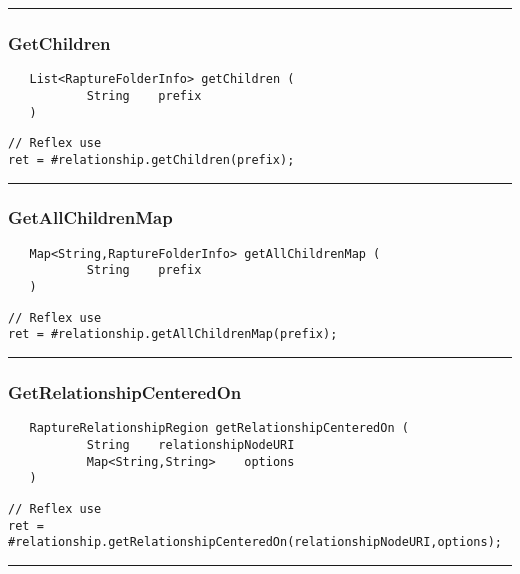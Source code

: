 \rule{15cm}{2pt}
\subsubsection{GetChildren}
\label{Api:GetChildren}
\begin{verbatim}
   List<RaptureFolderInfo> getChildren (
           String    prefix
   )
\end{verbatim}
\begin{lstlisting}[language=reflex]
// Reflex use
ret = #relationship.getChildren(prefix);
\end{lstlisting}



\rule{15cm}{2pt}
\subsubsection{GetAllChildrenMap}
\label{Api:GetAllChildrenMap}
\begin{verbatim}
   Map<String,RaptureFolderInfo> getAllChildrenMap (
           String    prefix
   )
\end{verbatim}
\begin{lstlisting}[language=reflex]
// Reflex use
ret = #relationship.getAllChildrenMap(prefix);
\end{lstlisting}



\rule{15cm}{2pt}
\subsubsection{GetRelationshipCenteredOn}
\label{Api:GetRelationshipCenteredOn}
\begin{verbatim}
   RaptureRelationshipRegion getRelationshipCenteredOn (
           String    relationshipNodeURI
           Map<String,String>    options
   )
\end{verbatim}
\begin{lstlisting}[language=reflex]
// Reflex use
ret = #relationship.getRelationshipCenteredOn(relationshipNodeURI,options);
\end{lstlisting}



\rule{15cm}{2pt}
